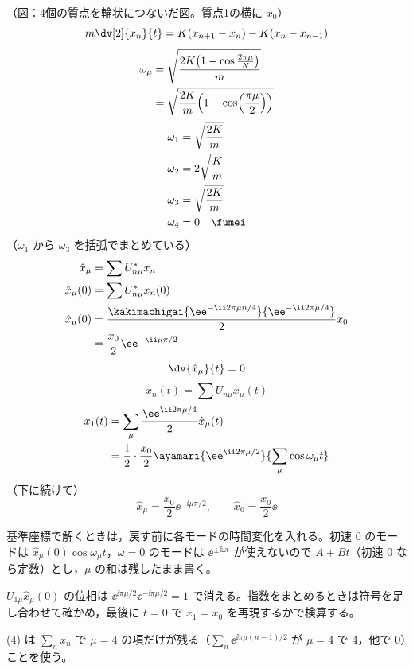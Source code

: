 （図：4個の質点を輪状につないだ図。質点1の横に $x_0$）
\[ m\dv[2]{x_n}{t}=K(x_{n+1}-x_n)-K(x_n-x_{n-1}) \]
\begin{align*}
  \omega_\mu&=\sqrt{\frac{2K\bigl(1-\cos\frac{2\pi\mu}{N}\bigr)}{m}}\\
  &=\sqrt{\frac{2K}{m}\Bigl(1-\cos\Bigl(\frac{\pi\mu}{2}\Bigr)\Bigr)}
\end{align*}
\begin{align*}
  \omega_1&=\sqrt{\frac{2K}{m}}\\
  \omega_2&=2\sqrt{\frac{K}{m}}\\
  \omega_3&=\sqrt{\frac{2K}{m}}\\
  \omega_4&=0\quad\fumei
\end{align*}
（$\omega_1$ から $\omega_3$ を括弧でまとめている）
\begin{align*}
  \hat{x}_\mu&=\sum U^{*}_{n\mu}x_n\\
  \hat{x}_\mu(0)&=\sum U^{*}_{n\mu}x_n(0)\\
  \hat{x}_\mu(0)&=\frac{\kakimachigai{\ee^{-\ii2\pi\mu n/4}}{\ee^{-\ii2\pi\mu/4}}}{2}x_0\\
  &=\frac{x_0}{2}\ee^{-\ii\mu\pi/2}
\end{align*}
\[ \dv{\hat{x}_\mu}{t}=0 \]
\[ x_n(t)=\sum U_{n\mu}\hat{x}_\mu(t) \]
\begin{align*}
  x_1(t)&=\sum_\mu\frac{\ee^{\ii2\pi\mu/4}}{2}\hat{x}_\mu(t)\\
  &=\frac{1}{2}\cdot\frac{x_0}{2}\ayamari{\ee^{\ii2\pi\mu/2}}{\sum_\mu\cos\omega_\mu t}
\end{align*}
（下に続けて）
\[ \hat{x}_\mu=\frac{x_0}{2}\ee^{-\ii\mu\pi/2},\qquad\hat{x}_0=\frac{x_0}{2}\ee \]
\mikai
\item 基準座標で解くときは，戻す前に各モードの時間変化を入れる。初速 0 のモードは $\hat{x}_\mu(0)\cos\omega_\mu t$，$\omega=0$ のモードは $\ee^{\pm\ii\omega t}$ が使えないので $A+Bt$（初速 0 なら定数）とし，$\mu$ の和は残したまま書く。
\item $U_{1\mu}\hat{x}_\mu(0)$ の位相は $\ee^{\ii\pi\mu/2}\ee^{-\ii\pi\mu/2}=1$ で消える。指数をまとめるときは符号を足し合わせて確かめ，最後に $t=0$ で $x_1=x_0$ を再現するかで検算する。
\item (4) は $\sum_nx_n$ で $\mu=4$ の項だけが残る（$\sum_n\ee^{\ii\pi\mu(n-1)/2}$ が $\mu=4$ で 4，他で 0）ことを使う。
